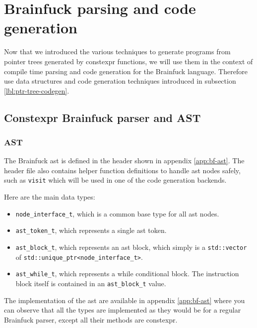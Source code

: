 \documentclass[../main]{subfiles}
\begin{document}
\section{
  Brainfuck parsing and code generation
}

Now that we introduced the various techniques to generate programs from
pointer trees generated by \gls{constexpr} functions, we will use them in the
context of compile time parsing and code generation for the Brainfuck language.
Therefore use data structures and code generation techniques introduced in
subsection \ref{lbl:ptr-tree-codegen}.

\subsection{
  Constexpr Brainfuck parser and AST
}

\subsubsection{
  AST
}

The Brainfuck \gls{ast} is defined in the header shown in appendix \ref{app:bf-ast}.
The header file also contains helper function definitions to handle \gls{ast} nodes
safely, such as \lstinline{visit} which will be used in one of the
code generation backends.

Here are the main data types:

\begin{itemize}
\item
\lstinline{node_interface_t}, which is a common base type for all \gls{ast} nodes.

\item
\lstinline{ast_token_t}, which represents a single \gls{ast} token.

\item
\lstinline{ast_block_t}, which represents an \gls{ast} block, which simply is a
\lstinline{std::vector} of \lstinline{std::unique_ptr<node_interface_t>}.

\item
\lstinline{ast_while_t}, which represents a while conditional block.
The instruction block itself is contained in an \lstinline{ast_block_t} value.

\end{itemize}

The implementation of the \gls{ast} are available in appendix \ref{app:bf-ast}
where you can observe that all the types are implemented as they would be
for a regular Brainfuck parser, except all their methods are \gls{constexpr}.
\end{document}
